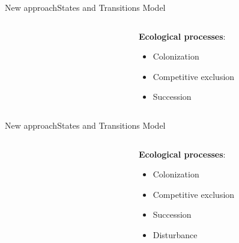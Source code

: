 \documentclass[10pt,aspectratio=149]{beamer}
\begin{document}
\begin{frame}{New approach}{States and Transitions Model}


\begin{columns}[t]
	\begin{column}[t]{.40\paperwidth}
		\begin{figure}
			\small{}
		\end{figure}
	\end{column}
	\begin{column}[t]{.50\paperwidth}
	\textbf{Ecological processes}:
	\begin{itemize}
		\item Colonization
		\item Competitive exclusion
		\item Succession
	\end{itemize}
	\end{column}
\end{columns}

\end{frame}


\begin{frame}{New approach}{States and Transitions Model}


\begin{columns}[t]
	\begin{column}[t]{.40\paperwidth}
		\begin{figure}
			\small{}
		\end{figure}
	\end{column}
	\begin{column}[t]{.50\paperwidth}
	\textbf{Ecological processes}:
	\begin{itemize}
		\item Colonization
		\item Competitive exclusion
		\item Succession
		\item Disturbance
	\end{itemize}
	\end{column}
\end{columns}

\end{frame}
\end{document}
